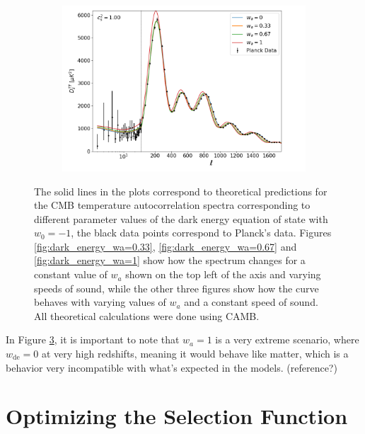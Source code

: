 \documentclass[openany,a4paper,12pt,oneside]{book}
\begin{document}
\begin{spacing}{1.5}
\begin{figure}
{\begin{subfigure}[t]{.43\paperwidth}
		\caption{}
		\label{fig:dark_energy_cs2=0.1}
	\end{subfigure}
	\hfill
	\begin{subfigure}[t]{.43\paperwidth}
		\centering
		\includegraphics[width=\linewidth]{Imagens/full_doublscale_Cs2fixo1.00.png}
		\caption{}
		\label{fig:dark_energy_cs2=1}
	\end{subfigure}
}
\caption{The solid lines in the plots correspond to theoretical predictions for the CMB temperature autocorrelation spectra corresponding to different parameter values of the dark energy equation of state with $w_0=-1$, the black data points correspond to Planck's data\cite{Planck_results}. Figures \ref{fig:dark_energy_wa=0.33}, \ref{fig:dark_energy_wa=0.67} and \ref{fig:dark_energy_wa=1} show how the spectrum changes for a constant value of $w_a$ shown on the top left of the axis and varying speeds of sound, while the other three figures show how the curve behaves with varying values of $w_a$ and a constant speed of sound. All theoretical calculations were done using CAMB.}
\label{fig:Dark_energy_tests}
\end{figure}

In Figure \ref{fig:Dark_energy_tests}, it is important to note that $w_a=1$ is a very extreme scenario, where $w_\text{de}=0$ at very high redshifts, meaning it would behave like matter, which is a behavior very incompatible with what's expected in the models. (reference?)

\chapter{Optimizing the Selection Function}\label{chapter:select_func_optimal}


\end{spacing}
\end{document}
